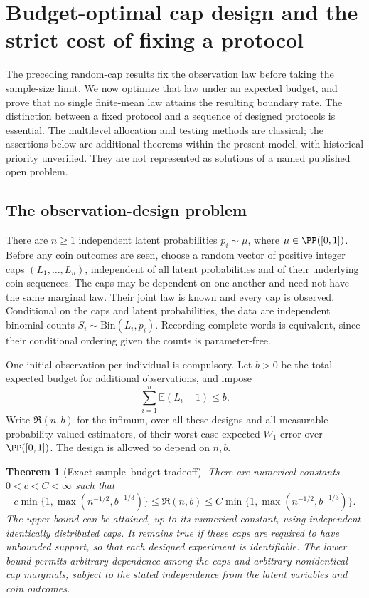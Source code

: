 \documentclass[11pt,a4paper]{article}
\newtheorem{theorem}{Theorem}[section]
\theoremstyle{definition}\newtheorem{definition}[theorem]{Definition}
\theoremstyle{remark}\newtheorem{remark}[theorem]{Remark}
\newcommand{\E}{\mathbb E}\newcommand{\one}{\mathbf 1}\newcommand{\1}{\mathbf 1}
\numberwithin{equation}{section}
\begin{document}
\clearpage
{}
\section{Budget-optimal cap design and the strict cost of fixing a protocol}
\label{ext-meiji-section}

The preceding random-cap results fix the observation law before taking
the sample-size limit. We now optimize that law under an expected budget,
and prove that no single finite-mean law attains the resulting boundary
rate. The distinction between a fixed protocol and a sequence of designed
protocols is essential. The multilevel allocation and testing methods are
classical; the assertions below are additional theorems within the present
model, with historical priority unverified. They are not represented as
solutions of a named published open problem.

\subsection{The observation-design problem}

There are $n\ge1$ independent latent probabilities $p_i\sim\mu$, where
$\mu\in\PP([0,1])$. Before any coin outcomes are seen, choose a random vector
of positive integer caps $(L_1,\ldots,L_n)$, independent of all latent
probabilities and of their underlying coin sequences. The caps may be
dependent on one another and need not have the same marginal law. Their
joint law is known and every cap is observed. Conditional on the caps and
latent probabilities, the data are independent binomial counts
$S_i\sim\mathrm{Bin}(L_i,p_i)$. Recording complete words is equivalent,
since their conditional ordering given the counts is parameter-free.

One initial observation per individual is compulsory. Let $b>0$ be the
total expected budget for additional observations, and impose
\[
 \sum_{i=1}^n\E(L_i-1)\le b.
\]
Write $\mathfrak R(n,b)$ for the infimum, over all these designs and all
measurable probability-valued estimators, of their worst-case expected
$W_1$ error over $\PP([0,1])$. The design is allowed to depend on $n,b$.

\begin{theorem}[Exact sample--budget tradeoff]
\label{ext-meiji-budget}
There are numerical constants $0<c<C<\infty$ such that
\[
 c\min\{1,\max(n^{-1/2},b^{-1/3})\}
 \le \mathfrak R(n,b)
 \le C\min\{1,\max(n^{-1/2},b^{-1/3})\}.
\]
The upper bound can be attained, up to its numerical constant, using
independent identically distributed caps. It remains true if these caps
are required to have unbounded support, so that each designed experiment
is identifiable. The lower bound permits arbitrary dependence among the
caps and arbitrary nonidentical cap marginals, subject to the stated
independence from the latent variables and coin outcomes.
\end{theorem}
\end{document}
